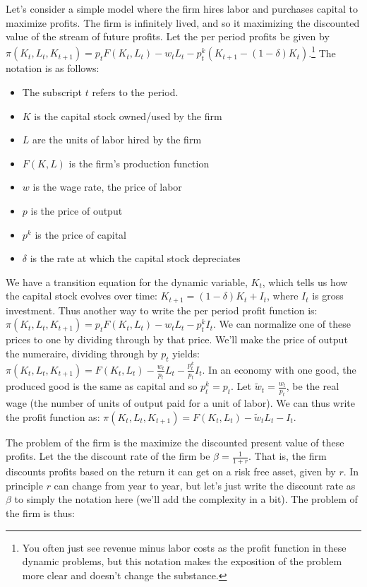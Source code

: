 \documentclass[letterpaper,12pt]{article}
\theoremstyle{definition}
\begin{document}
\begin{spacing}{1.5}
Let's consider a simple model where the firm hires labor and purchases capital to maximize profits.  The firm is infinitely lived, and so it maximizing the discounted value of the stream of future profits.  Let the per period profits be given by $\pi(K_{t},L_{t},K_{t+1}) = p_{t}F(K_{t},L_{t}) - w_{t}L_{t} - p^{k}_{t}(K_{t+1} - (1-\delta)K_{t})$.\footnote{You often just see revenue minus labor costs as the profit function in these dynamic problems, but this notation makes the exposition of the problem more clear and doesn't change the substance.}  The notation is as follows:
\begin{itemize}
\item The subscript $t$ refers to the period. 
\item $K$ is the capital stock owned/used by the firm
\item $L$ are the units of labor hired by the firm
\item $F(K,L)$ is the firm's production function
\item $w$ is the wage rate, the price of labor
\item $p$ is the price of output
\item $p^{k}$ is the price of capital
\item $\delta$ is the rate at which the capital stock depreciates
\end{itemize}

We have a transition equation for the dynamic variable, $K_{t}$, which tells us how the capital stock evolves over time: $K_{t+1} = (1-\delta)K_{t} + I_{t}$, where $I_{t}$ is gross investment. Thus another way to write the per period profit function is: $\pi(K_{t},L_{t},K_{t+1}) = p_{t}F(K_{t},L_{t}) - w_{t}L_{t} - p^{k}_{t}I_{t}$.  We can normalize one of these prices to one by dividing through by that price.  We'll make the price of output the numeraire, dividing through by $p_{t}$ yields: $\pi(K_{t},L_{t},K_{t+1}) = F(K_{t},L_{t}) - \frac{w_{t}}{p_{t}}L_{t} - \frac{p^{k}_{t}}{p_{t}}I_{t}$.  In an economy with one good, the produced good is the same as capital and so $p^{k}_{t}=p_{t}$.   Let $\tilde{w}_{t}=\frac{w_{t}}{p_{t}}$, be the real wage (the number of units of output paid for a unit of labor).  We can thus write the profit function as: $\pi(K_{t},L_{t},K_{t+1}) = F(K_{t},L_{t}) - \tilde{w}_{t}L_{t} - I_{t}$.

The problem of the firm is the maximize the discounted present value of these profits.  Let the the discount rate of the firm be $\beta=\frac{1}{1+r}$.  That is, the firm discounts profits based on the return it can get on a risk free asset, given by $r$.  In principle $r$ can change from year to year, but let's just write the discount rate as $\beta$ to simply the notation here (we'll add the complexity in a bit).  The problem of the firm is thus:


\end{spacing}
\end{document}
